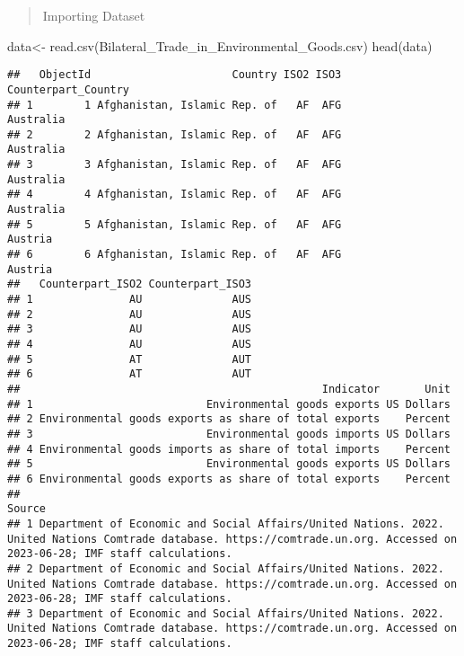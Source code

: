 \documentclass[
]{article}
\newenvironment{Shaded}{\begin{snugshade}}{\end{snugshade}}
\newcommand{\FunctionTok}[1]{\textcolor[rgb]{0.00,0.00,0.00}{#1}}
\newcommand{\NormalTok}[1]{#1}
\newcommand{\OtherTok}[1]{\textcolor[rgb]{0.56,0.35,0.01}{#1}}
\newcommand{\StringTok}[1]{\textcolor[rgb]{0.31,0.60,0.02}{#1}}
\begin{document}
\begin{quote}
Importing Dataset
\end{quote}

\begin{Shaded}
\begin{Highlighting}[]
\NormalTok{data}\OtherTok{\textless{}{-}} \FunctionTok{read.csv}\NormalTok{(}\StringTok{\textquotesingle{}Bilateral\_Trade\_in\_Environmental\_Goods.csv\textquotesingle{}}\NormalTok{)}
\FunctionTok{head}\NormalTok{(data)}
\end{Highlighting}
\end{Shaded}

\begin{verbatim}
##   ObjectId                      Country ISO2 ISO3 Counterpart_Country
## 1        1 Afghanistan, Islamic Rep. of   AF  AFG           Australia
## 2        2 Afghanistan, Islamic Rep. of   AF  AFG           Australia
## 3        3 Afghanistan, Islamic Rep. of   AF  AFG           Australia
## 4        4 Afghanistan, Islamic Rep. of   AF  AFG           Australia
## 5        5 Afghanistan, Islamic Rep. of   AF  AFG             Austria
## 6        6 Afghanistan, Islamic Rep. of   AF  AFG             Austria
##   Counterpart_ISO2 Counterpart_ISO3
## 1               AU              AUS
## 2               AU              AUS
## 3               AU              AUS
## 4               AU              AUS
## 5               AT              AUT
## 6               AT              AUT
##                                               Indicator       Unit
## 1                           Environmental goods exports US Dollars
## 2 Environmental goods exports as share of total exports    Percent
## 3                           Environmental goods imports US Dollars
## 4 Environmental goods imports as share of total imports    Percent
## 5                           Environmental goods exports US Dollars
## 6 Environmental goods exports as share of total exports    Percent
##                                                                                                                                                                       Source
## 1 Department of Economic and Social Affairs/United Nations. 2022. United Nations Comtrade database. https://comtrade.un.org. Accessed on 2023-06-28; IMF staff calculations.
## 2 Department of Economic and Social Affairs/United Nations. 2022. United Nations Comtrade database. https://comtrade.un.org. Accessed on 2023-06-28; IMF staff calculations.
## 3 Department of Economic and Social Affairs/United Nations. 2022. United Nations Comtrade database. https://comtrade.un.org. Accessed on 2023-06-28; IMF staff calculations.

\end{verbatim}
\end{document}
